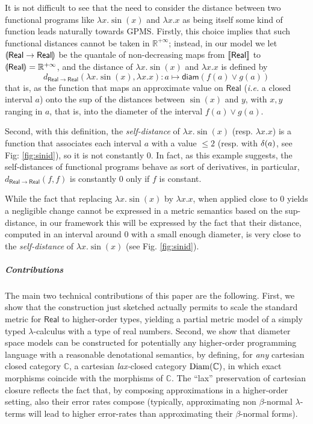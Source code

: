 It is not difficult to see that the need to consider the distance between two functional programs like $\lambda x.\sin(x)$ and $\lambda x.x$ as being itself some kind of function leads naturally towards GPMS. Firstly, this choice implies that such functional distances cannot be taken in $\mathbb R^{+\infty}$; instead, in our model 
we let $\llparenthesis \mathsf{Real}\to\mathsf{Real} \rrparenthesis$ be the quantale of non-decreasing maps from $\llbracket \mathsf{Real} \rrbracket$ to $\llparenthesis \mathsf{Real} \rrparenthesis=\mathbb R^{+\infty}$, and the distance of  $\lambda x.\sin(x)$ and $\lambda x.x$ is defined by 
$$ d_{\mathsf{Real}\to\mathsf{Real}}(\lambda x.\sin(x),\lambda x.x): a \mapsto \mathsf{diam}(f(a)\vee g(a))$$
that is, as the function that maps an approximate value on $\mathsf{Real}$ (\textit{i.e.} a closed interval $a$) onto the sup of the distances between $\sin(x)$ and $ y$, with $x,y$ ranging in $a$, that is, into the diameter of the interval $f(a)\vee g(a)$. 


Second, with this definition, the \emph{self-distance} of $\lambda x.\sin(x)$ (resp. $\lambda x.x$)  is a function that associates each interval $a$ with a value $\leq 2$ (resp. with $\delta(a)$, see Fig: \ref{fig:sinid}), so it is not constantly 0. In fact, as this example suggests, the self-distances of functional programs behave as sort of derivatives, in particular, $ d_{\mathsf{Real}\to\mathsf{Real}}(f,f)$ is constantly 0 only if $f$ is constant. %


While the fact that replacing  $\lambda x.\sin(x)$ by $\lambda x.x$, when applied close to 0 yields a negligible change cannot be expressed in a metric semantics based on the sup-distance, in our framework this will be expressed by the fact that their distance, computed in an interval around $0$ with a small enough diameter, is very close to the \emph{self-distance} of $\lambda x.\sin(x)$ (see Fig. \ref{fig:sinid}). 







\subparagraph*{Contributions}
The main two technical contributions of this paper are the following. First, we show that the construction just sketched actually permits to scale the standard  metric for $\mathsf{Real}$ to higher-order types, yielding a partial metric model of a simply typed $\lambda$-calculus with a type of real numbers.
Second, we show that diameter space models can be constructed for potentially any higher-order programming language with a reasonable denotational semantics, by defining, for \emph{any} cartesian closed category $\mathbb C$, a cartesian \emph{lax-}closed category $\operatorname{Diam}(\mathbb C)$, in which exact morphisms coincide with the morphisms of $\mathbb C$. The ``lax'' preservation of cartesian closure reflects the fact that, by composing approximations in a higher-order setting, also their error rates compose (typically, approximating non $\beta$-normal $\lambda$-terms will lead to higher error-rates than approximating their $\beta$-normal forms). 




